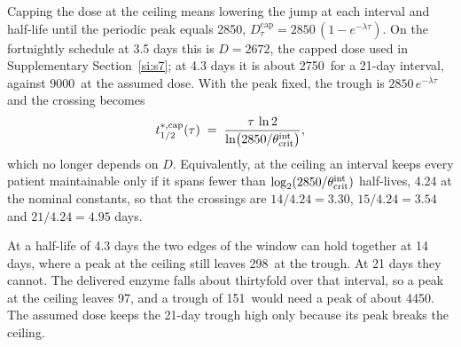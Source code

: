 Capping the dose at the ceiling means lowering the jump at each interval and half-life until the
periodic peak equals 2850\um, $D_\tau^{\mathrm{cap}}=2850\,(1-e^{-\lambda\tau})$. On the
fortnightly schedule at 3.5 days this is $D=2672$\um, the capped dose used in Supplementary
Section~\ref{si:s7}; at 4.3 days it is about 2750\um\ for a 21-day interval, against 9000\um\ at
the assumed dose. With the peak fixed, the trough is $2850\,e^{-\lambda\tau}$ and the crossing
becomes
\begin{equation}
\label{seq:s6-capcross}
t_{1/2}^{\ast,\mathrm{cap}}(\tau)\;=\;\frac{\tau\,\ln2}{\ln\bigl(2850/\theta_{\mathrm{crit}}^{\mathrm{int}}\bigr)} ,
\end{equation}
which no longer depends on $D$. Equivalently, at the ceiling an interval keeps every patient
maintainable only if it spans fewer than $\log_2(2850/\theta_{\mathrm{crit}}^{\mathrm{int}})$ half-lives, 4.24 at the nominal
constants, so that the crossings are $14/4.24=3.30$, $15/4.24=3.54$ and $21/4.24=4.95$ days.

At a half-life of 4.3 days the two edges of the window can hold together at 14 days, where a
peak at the ceiling still leaves 298\um\ at the trough. At 21 days they cannot. The delivered
enzyme falls about thirtyfold over that interval, so a peak at the ceiling leaves 97\um, and a
trough of 151\um\ would need a peak of about 4450\um. The assumed dose keeps the 21-day trough
high only because its peak breaks the ceiling.

